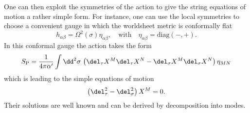%
%
One can then exploit the symmetries of the  action to give the string equations of motion a rather simple form. For instance, one can use the local symmetries to choose a convenient gauge in which the worldsheet metric is conformally flat
%
%
\begin{equation}
h_{\alpha\beta} = \Omega^{2}(\sigma) \eta_{\alpha\beta}, \quad \text{with} \quad \eta_{\alpha\beta} = \text{diag}(-,+).
\end{equation}
%
%
In this conformal gauge the  action takes the form 
%
%
\begin{equation}
S_{\rm P} = \frac{1}{4\pi\alpha'} \int \dd^{2}\sigma\, \left(\del_{\tau}X^{M}\del_{\tau}X^{N}-\del_{\sigma}X^{M}\del_{\sigma}X^{N}\right)\eta_{MN}
\end{equation}
%
%
which is leading to the simple equations of motion
%
%
\begin{equation}
\left(\del_{\tau}^{2}-\del_{\sigma}^{2}\right)X^{M}=0.
\end{equation}
%
%
Their solutions are well known and can be derived by decomposition into  modes.
%
%
%
%
%
%
%
%
%
%
